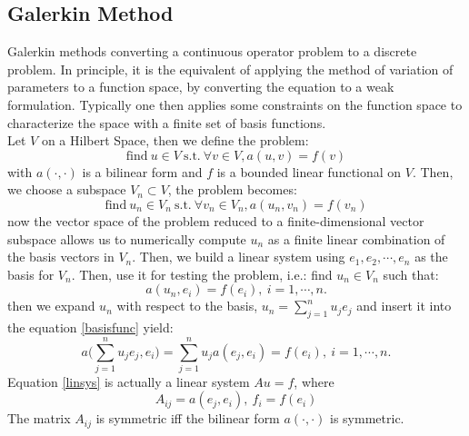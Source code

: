\documentclass[a4paper,12pt]{article}
\begin{document}
\subsection{Galerkin Method}
Galerkin methods converting a continuous operator problem to a discrete problem. In principle, it is the equivalent of applying the method of variation of parameters to a function space, by converting the equation to a weak formulation. Typically one then applies some constraints on the function space to characterize the space with a finite set of basis functions.\\
Let $V$ on a Hilbert Space, then we define the problem:
\begin{equation}
\text{find}\ u \in V\ \text{s.t.}\ \forall v \in V, a(u,v) = f(v)
\end{equation}
with $a(\cdot,\cdot)$ is a bilinear form and $f$ is a bounded linear functional on $V$. Then, we choose a subspace $V_n \subset V$, the problem becomes:
\begin{equation}
\text{find}\ u_n \in V_n\ \text{s.t.}\ \forall v_n \in V_n, a(u_n,v_n) = f(v_n)
\end{equation}
now the vector space of the problem reduced to a finite-dimensional vector subspace allows us to numerically compute $u_n$ as a finite linear combination of the basis vectors in $V_n$. Then, we build a linear system using $e_1,e_2,\cdots,e_n$ as the basis for $V_n$. Then, use it for testing the problem, i.e.: find $u_n\in V_n$ such that:
\begin{equation}\label{basisfunc}
a(u_n,e_i) = f(e_i),\ i=1,\cdots,n.
\end{equation}
then we expand $u_n$ with respect to the basis, $u_n = \sum_{j=1}^n u_j e_j$ and insert it into the equation \ref{basisfunc} yield:
\begin{equation}\label{linsys}
a\bigg( \sum_{j=1}^{n}u_j e_j,e_i \bigg) = \sum_{j=1}^{n} u_j a(e_j,e_i) = f(e_i),\ i=1,\cdots,n.
\end{equation}
Equation \ref{linsys} is actually a linear system $Au = f$, where
\begin{equation}
A_{ij} = a(e_j,e_i),\ f_i=f(e_i)
\end{equation}
The matrix $A_{ij}$ is symmetric iff the bilinear form $a(\cdot,\cdot)$ is symmetric.
\end{document}
